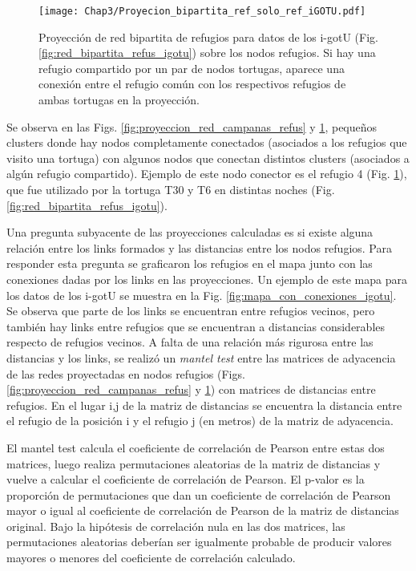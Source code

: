 \begin{figure}[ht]
    \begin{center}
        \texttt{[image: Chap3/Proyecion\_bipartita\_ref\_solo\_ref\_iGOTU.pdf]}
        \caption[Proyección  de red bipartita de refugios para datos de los i-gotU en nodos refugios.]{Proyección  de red bipartita de refugios para datos de los i-gotU (Fig. \ref{fig:red_bipartita_refus_igotu}) sobre los nodos refugios. Si hay una refugio compartido por un par de nodos tortugas, aparece una conexión entre el refugio común con los respectivos refugios de ambas tortugas en la proyección. }
        \label{fig:proyeccion_red_igotu_refus}
       
        \end{center}
\end{figure}
Se observa en las Figs. \ref{fig:proyeccion_red_campanas_refus} y \ref{fig:proyeccion_red_igotu_refus}, pequeños clusters donde hay nodos completamente conectados (asociados a los refugios que visito una tortuga) con algunos nodos que conectan distintos clusters (asociados a algún refugio compartido). Ejemplo de este nodo conector es el refugio 4 (Fig. \ref{fig:proyeccion_red_igotu_refus}), que fue utilizado por la tortuga T30 y T6 en distintas noches (Fig. \ref{fig:red_bipartita_refus_igotu}).
 
Una pregunta subyacente de las proyecciones calculadas es si existe alguna relación entre los links formados y las distancias entre los nodos refugios. Para responder esta pregunta se graficaron los refugios en el mapa junto con las conexiones dadas por los links en las proyecciones. Un ejemplo de este mapa para los datos de los i-gotU se muestra en la Fig. \ref{fig:mapa_con_conexiones_igotu}. Se observa que parte de los links se encuentran entre refugios vecinos, pero también hay links entre refugios que se encuentran a distancias considerables respecto de refugios vecinos. A falta de una relación más rigurosa entre las distancias y los links, se realizó un \textit{mantel test} \cite{MantelTest} entre las matrices de adyacencia de las redes proyectadas en nodos refugios (Figs. \ref{fig:proyeccion_red_campanas_refus} y \ref{fig:proyeccion_red_igotu_refus}) con matrices de distancias entre refugios. En el lugar i,j de la matriz de distancias se encuentra la distancia entre el refugio  de la posición i y el refugio j (en metros) de la matriz de adyacencia.
 
El mantel test calcula el coeficiente de correlación de Pearson entre estas dos matrices, luego realiza permutaciones aleatorias de la matriz de distancias y vuelve a calcular el coeficiente de correlación de Pearson. El p-valor es la proporción de permutaciones que dan un coeficiente de correlación de Pearson mayor o igual al coeficiente de correlación de Pearson de la matriz de distancias original. Bajo la hipótesis de correlación nula en las dos matrices, las permutaciones aleatorias deberían ser igualmente probable de producir valores mayores o menores del coeficiente de correlación calculado.
 
